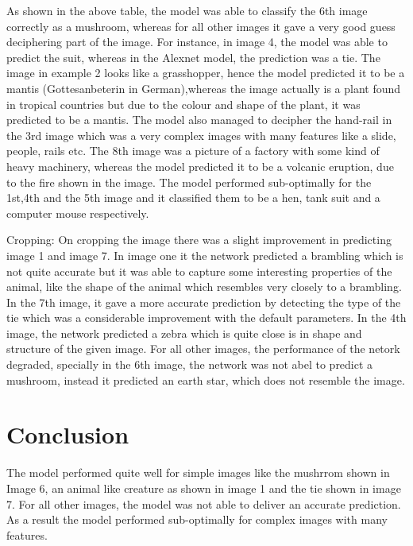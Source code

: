 \documentclass[conference]{IEEEtran}
\begin{document}
As shown in the above table, the model was able to classify the 6th image correctly as a mushroom, whereas for all other images it gave a very good guess deciphering part of the image. For instance, in image 4, the model was able to predict the suit, whereas in the Alexnet model, the prediction was a tie. The image in example 2 looks like a grasshopper, hence  the model predicted it to be a mantis (Gottesanbeterin in German),whereas the image actually is a plant found in tropical countries but due to the colour and shape of the plant, it was predicted to be a mantis. The model also managed to decipher the hand-rail in the 3rd image which was a very complex images with many features like a slide, people, rails etc. The 8th image was a picture of a factory with some kind of heavy machinery, whereas the model predicted it to be a volcanic eruption, due to the fire shown in the image. The model performed sub-optimally for the 1st,4th and the 5th image and it  classified them to be a hen, tank suit and a computer mouse respectively. 

Cropping: On cropping the image there was a slight improvement  in predicting image 1 and image 7. In image one it the network predicted a brambling  which is not quite accurate but it was able to capture some interesting properties of the animal, like the shape of the animal which resembles very closely to a brambling. In the 7th image, it gave a more accurate prediction by detecting the type of the tie which was a considerable improvement with the default parameters. In the 4th image, the network predicted a zebra which is quite close is in shape and structure of the given image. For all other images, the performance of the netork degraded, specially in the 6th image, the network was not abel to predict a mushroom, instead it predicted an earth star, which does not resemble the image. 



\section{Conclusion}

The model performed quite well for simple images like the mushrrom shown in Image 6, an animal like creature as shown in image 1 and the tie shown in image 7. For all other images, the model was not able to deliver an accurate prediction. As a result  the model performed sub-optimally for complex images with many features.  
\end{document}
